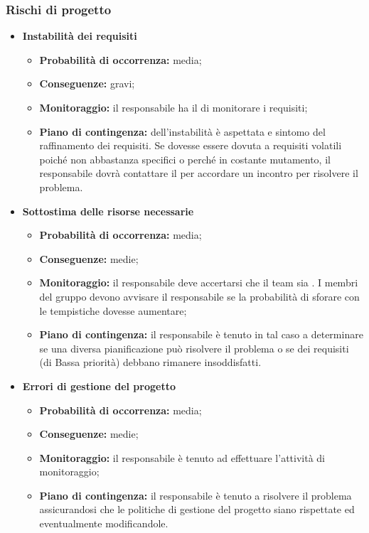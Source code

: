 	\subsubsection{Rischi di progetto}
		\begin{itemize}
		\item \textbf{Instabilità dei requisiti}
			\begin{itemize}
				\item \textbf{Probabilità di occorrenza:} media;
				\item \textbf{Conseguenze:} gravi;
				\item \textbf{Monitoraggio:} il responsabile ha il  di monitorare i requisiti;
				\item \textbf{Piano di contingenza:} dell'instabilità è aspettata e sintomo del raffinamento dei requisiti.	Se dovesse essere dovuta a requisiti volatili poiché non abbastanza specifici o perché in costante mutamento, il responsabile dovrà contattare il  per accordare un incontro per risolvere il problema.
			\end{itemize}
		\item \textbf{Sottostima delle risorse necessarie}
			\begin{itemize}
				\item \textbf{Probabilità di occorrenza:} media;
				\item \textbf{Conseguenze:} medie;
				\item \textbf{Monitoraggio:} il responsabile deve accertarsi che il team sia . I membri del gruppo devono avvisare il responsabile se la probabilità di sforare con le tempistiche dovesse aumentare;
				\item \textbf{Piano di contingenza:} il responsabile è tenuto in tal caso a determinare se una diversa pianificazione può risolvere il problema o se dei requisiti (di Bassa priorità) debbano rimanere insoddisfatti.
			\end{itemize}
		\item \textbf{Errori di gestione del progetto}
			\begin{itemize}
				\item \textbf{Probabilità di occorrenza:} media;
				\item \textbf{Conseguenze:} medie;
				\item \textbf{Monitoraggio:} il responsabile è tenuto ad effettuare l'attività di monitoraggio;
				\item \textbf{Piano di contingenza:} il responsabile è tenuto a risolvere il problema assicurandosi che le politiche di gestione del progetto siano rispettate ed eventualmente modificandole.
			\end{itemize}
		\end{itemize}
\pagebreak
